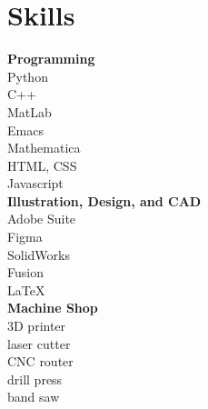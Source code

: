 \documentclass[10pt]{article} %
\begin{document}
\begin{minipage}[t]{0.2\textwidth}
 \section*{Skills}
\textbf{Programming}\\
Python\\
C++\\
MatLab\\
Emacs\\
Mathematica\\
HTML, CSS\\
Javascript\\

\textbf{Illustration, Design, and CAD}\\
Adobe Suite\\
Figma\\
SolidWorks\\
Fusion\\
LaTeX\\

\textbf{Machine Shop}\\
3D printer\\ laser cutter\\ CNC router\\ drill press\\ band saw
\end{minipage}
\end{document}
